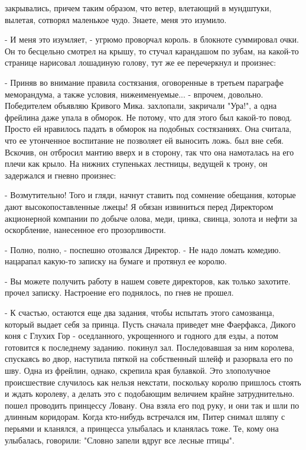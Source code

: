 закрывались, причем таким образом, что ветер, влетающий в мундштуки, 
вылетая, сотворял маленькое чудо. Знаете, меня это изумило.
\par- И меня это изумляет, - угрюмо проворчал король.
 в блокноте суммировал очки. Он то бесцельно смотрел на 
крышу, то стучал карандашом по зубам, на какой-то странице нарисовал 
лошадиную голову, тут же ее перечеркнул и произнес:
\par- Приняв во внимание правила состязания, оговоренные в третьем 
параграфе меморандума, а также условия, нижеименуемые... - впрочем, 
довольно. Победителем объявляю Кривого Мика.
 захлопали, закричали "Ура!", а одна фрейлина даже упала в 
обморок. Не потому, что для этого был какой-то повод. Просто ей 
нравилось падать в обморок на подобных состязаниях. Она считала, что 
ее утонченное воспитание не позволяет ей выносить ложь.
 был вне себя. Вскочив, он отбросил мантию вверх и в 
сторону, так что она намоталась на его плечи как крыло. На нижних 
ступеньках лестницы, ведущей к трону, он задержался и гневно произнес:
\par- Возмутительно! Того и гляди, начнут ставить под сомнение 
обещания, которые дают высокопоставленные лжецы! Я обязан извиниться 
перед Директором акционерной компании по добыче олова, меди, цинка, 
свинца, золота и нефти за оскорбление, нанесенное его прозорливости.
\par- Полно, полно, - поспешно отозвался Директор. - Не надо ломать 
комедию.
 нацарапал какую-то записку на бумаге и протянул ее королю.
\par- Вы можете получить работу в нашем совете директоров, как только 
захотите.
 прочел записку. Настроение его поднялось, по гнев не 
прошел.
\par- К счастью, остаются еще два задания, чтобы испытать этого 
самозванца, который выдает себя за принца. Пусть сначала приведет мне 
Фаерфакса, Дикого коня с Глухих Гор - оседланного, укрощенного и 
годного для езды, а потом готовится к последнему заданию.
 покинул зал. Последовавшая за ним королева, спускаясь во 
двор, наступила пяткой на собственный шлейф и разорвала его по шву. 
Одна из фрейлин, однако, скрепила края булавкой. Это злополучное 
происшествие случилось как нельзя некстати, поскольку королю пришлось 
стоять и ждать королеву, а делать это с подобающим величием крайне 
затруднительно.
 пошел проводить принцессу Ловану. Она взяла его под руку, и 
они так и шли по длинным коридорам. Когда кто-нибудь встречался им, 
Питер снимал шляпу с перьями и кланялся, а принцесса улыбалась и 
кланялась тоже. Те, кому она улыбалась, говорили: "Словно запели вдруг 
все лесные птицы".

